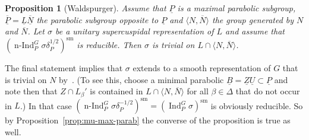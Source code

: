 \documentclass[a4paper]{amsart}
\numberwithin{equation}{section}
\newtheorem{prop}[thm]{Proposition}
\theoremstyle{remark}
\theoremstyle{definition}
\DeclareMathOperator{\Ind}{Ind}
\DeclareMathOperator{\nInd}{n-Ind}
\newcommand{\sm}{\mathrm{sm}}
\newcommand{\alggrp}[1]{\underline{#1}}
\begin{document}
\begin{prop}[Waldspurger]\label{prop:Waldspurger}
Assume that $\alggrp{P}$ is a maximal parabolic subgroup, $\overline{\alggrp{P}} = \alggrp{L}\overline{\alggrp{N}}$ the parabolic subgroup opposite to $\alggrp{P}$ and $\langle N,\overline{N}\rangle$ the group generated by $N$ and $\overline{N}$.
Let $\sigma$ be a unitary supercuspidal representation of $L$ and assume that $(\nInd_{P}^{G}\sigma \delta_{P}^{1/2})^{\sm}$ is reducible.
Then $\sigma$ is trivial on $L\cap \langle N,\overline{N}\rangle$.
\end{prop}
The final statement implies that $\sigma$ extends to a smooth representation of $G$ that is trivial on $N$ by~\cite[II.7 Proposition]{AHHV}.
(To see this, choose a minimal parabolic $\alggrp{B} = \alggrp{Z}\alggrp{U} \subset \alggrp{P}$ and note then that $Z \cap L_\beta'$ is contained in $L \cap \langle N,\overline{N}\rangle$
for all $\beta \in \Delta$ that do not occur in $L$.)
In that case $(\nInd_{P}^{G}\sigma \delta_{P}^{-1/2})^{\sm} = (\Ind_{P}^{G}\sigma)^{\sm}$ is obviously reducible.
So by Proposition~\ref{prop:mu-max-parab} the converse of the proposition is true as well.
\end{document}
